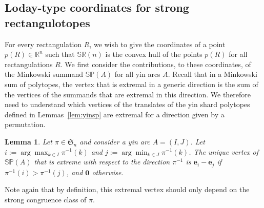 \documentclass{amsart}
\newtheorem{lemma}[theorem]{Lemma}
\theoremstyle{definition}
\newcommand{\R}{\mathbb{R}} %
\newcommand{\f}[1]{\mathfrak{#1}} %
\newcommand{\polytope}[1]{\mathds{#1}} %
\newcommand{\SRP}{\polytope{SR}} %
\newcommand{\SP}{\polytope{SP}}
\begin{document}

\subsection{Loday-type coordinates for strong rectangulotopes}

For every rectangulation $R$, we wish to give the coordinates of a point $p(R)\in\R^n$ such that $\SRP(n)$ is the convex hull of the points $p(R)$ for all rectangulations $R$.
We first consider the contributions, to these coordinates, of the Minkowski summand $\SP(A)$ for all yin arcs $A$.
Recall that in a Minkowski sum of polytopes, the vertex that is extremal in a generic direction is the sum of the vertices of the summands that are extremal in this direction.
We therefore need to understand which vertices of the translates of the yin shard polytopes defined in Lemmas~\ref{lem:yinsp} are extremal for a direction given by a permutation.

\begin{lemma}
  \label{lem:yinminmax}
  Let $\pi\in\f{S}_n$ and consider a yin arc $A=(I,J)$.
  Let $i := \arg\max_{k\in I} \pi^{-1}(k)$ and $j := \arg\min_{k\in J} \pi^{-1}(k)$.
  The unique vertex of $\SP(A)$ that is extreme with respect to the direction $\pi^{-1}$
  is $\mathbf{e}_i-\mathbf{e}_j$ if $\pi^{-1}(i)>\pi^{-1}(j)$, and $\mathbf{0}$ otherwise.
\end{lemma}

Note again that by definition, this extremal vertex should only depend on the strong congruence class of $\pi$.
\end{document}
